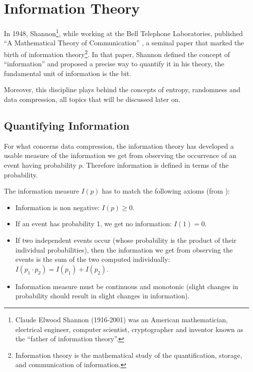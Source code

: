 \documentclass[12pt, a4paper]{report}
\begin{document}
\pagestyle{fancy}
\tableofcontents
\clearpage

\pagestyle{fancy}
\newpage
{}
\chapter{Information Theory}

In 1948, Shannon\footnote{Claude Elwood Shannon (1916-2001) was an American mathematician, electrical engineer, computer
scientist, cryptographer and inventor known as the ``father of information theory''.}, while working at the Bell Telephone
Laboratories, published ``A Mathematical Theory of Communication'' \cite{AMathematicalTheoryOfCommunication}, a seminal paper that
marked the birth of information theory\footnote{Information theory is the mathematical study of the quantification, storage, and
communication of information.}.
In that paper, Shannon defined the concept of ``information'' and proposed a precise way to quantify it in his theory, the
fundamental unit of information is the bit.

Moreover, this discipline plays behind the concepts of entropy, randomness and data compression, all topics that will be discussed
later on.

\section{Quantifying Information}

For what concerns data compression, the information theory has developed a usable measure of the information we get from observing
the occurrence of an event having probability \(p\).
Therefore information is defined in terms of the probability.

The information measure \(I(p)\) has to match the following axioms (from \cite{AnIntroductionToInformationTheoryAndEntropy}):

\begin{itemize}
  \item Information is non negative: \(I(p) \geq 0\).
  \item If an event has probability 1, we get no information: \(I(1) = 0\).
  \item If two independent events occur (whose probability is the product of their individual probabilities), then the information
  we get from observing the events is the sum of the two computed individually: \(I(p_1 \cdot p_2) = I(p_1) + I(p_2)\).
  \item Information measure must be continuous and monotonic (slight changes in probability should result in slight changes in
  information).
\end{itemize}
\end{document}
